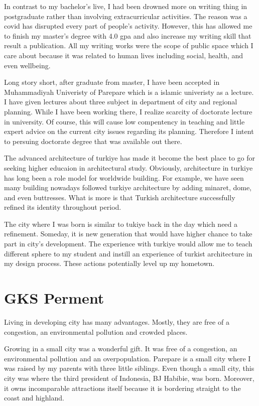 \documentclass[../main.tex]{subfiles}
\begin{document}
In contrast to my bachelor's live, I had been drowned more on writing thing in postgraduate rather than involving extracurricular activities. The reason was a covid has disrupted every part of people's activity. However, this has allowed me to finish my master's degree with 4.0 gpa and also increase my writing skill that result a publication. All my writing works were the scope of public space which I care about because it was related to human lives including social, health, and even wellbeing.

Long story short, after graduate from master, I have been accepted in Muhammadiyah Univeristy of Parepare which is a islamic univeristy as a lecture. I have given lectures about three subject in department of city and regional planning. While I have been working there, I realize scarcity of doctorate lecture in university. Of course, this will cause low compentency in teaching and little expert advice on the current city issues regarding its planning. Therefore I intent to persuing doctorate degree that was available out there.

The advanced architecture of turkiye has made it become the best place to go for seeking higher educaion in architectural study. Obviously, architecture in turkiye has long been a role model for worldwide building. For example, we have seen many building nowadays followed turkiye architecture by adding minaret, dome, and even buttresses. What is more is that Turkish architecture successfully refined its identity throughout period.

The city where I was born is similar to tukiye back in the day which need a refinement. Someday, it is new generation that would have higher chance to take part in city's development. The experience with turkiye would allow me to teach different sphere to my student and instill an experience of turkist architecture in my design process. These actions potentially level up my hometown.


\section{GKS Perment}

Living in developing city has many advantages. Mostly, they are free of a congestion, an environmental pollution and crowded places.

Growing in a small city was a wonderful gift. It was free of a congestion, an environmental pollution and an overpopulation. Parepare is a small city where I was raised by my parents with three little siblings. Even though a small city, this city was where the third president of Indonesia, BJ Habibie, was born.
Moreover, it owns incomparable attractions itself because it is bordering straight to the coast and highland.
\end{document}
